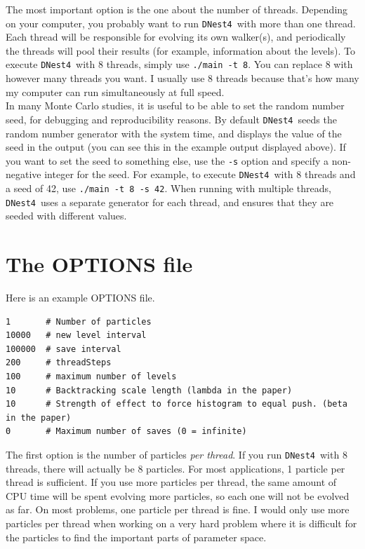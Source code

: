 \documentclass[a4paper, 11pt]{article}
\newcommand{\dnest}{{\tt DNest4}}
\begin{document}
The most important option is the one about the number of threads. Depending on
your computer, you probably want to run \dnest~with more than one thread.
Each thread will be responsible for evolving its own walker(s), and periodically
the threads will pool their results (for example, information about the
levels). To execute \dnest~with 8 threads, simply use {\tt ./main -t 8}. You can
replace 8 with however many threads you want. I usually use 8 threads because
that's how many my computer can run simultaneously at full speed.\\

In many Monte Carlo studies, it is useful to be able to set the random number
seed, for debugging and reproducibility reasons. By default \dnest~seeds the
random number generator with the system time, and displays the value of the
seed in the output (you can see this in the example output displayed above).
If you want to set the seed to
something else, use the {\tt -s} option and specify a non-negative integer for
the seed. For example, to execute \dnest~with
8 threads and a seed of 42, use {\tt ./main -t 8 -s 42}.
When running with multiple threads, \dnest~uses a separate generator for each
thread, and ensures that they are seeded with different values.\\

\section{The OPTIONS file}\label{sec:options}
Here is an example OPTIONS file.
\begin{framed}
\begin{verbatim}
1       # Number of particles
10000   # new level interval
100000  # save interval
200     # threadSteps
100     # maximum number of levels
10      # Backtracking scale length (lambda in the paper)
10      # Strength of effect to force histogram to equal push. (beta in the paper)
0       # Maximum number of saves (0 = infinite)
\end{verbatim}
\end{framed}

The first option is the number of particles {\it per thread}. If you run
\dnest~with 8 threads, there will actually be 8 particles. For most
applications, 1 particle per thread is sufficient. If you use more particles
per thread, the same amount of CPU time will be spent evolving more particles,
so each one will not be evolved as far. On most problems, one particle per
thread is fine. I would only use more particles per thread when working on
a very hard problem where it is difficult for the particles to find the
important parts of parameter space.\\
\end{document}
